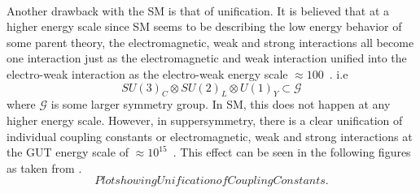 \paragraph*{}
Another drawback with the SM is that of unification. It is believed that at a higher energy scale since SM seems to be describing the low energy behavior of some parent theory, the electromagnetic, weak and strong interactions all become one interaction just as the electromagnetic and weak interaction unified into the electro-weak interaction as the electro-weak energy scale $\approx 100$~\GeV. i.e
\begin{equation}
SU(3)_{C} \otimes SU(2)_{L} \otimes U(1)_{Y} \subset \mathcal{G}
\end{equation}
where $\mathcal{G}$ is some larger symmetry group. In SM, this does not happen at any higher energy scale. However, in suppersymmetry, there is a clear unification of individual coupling constants or electromagnetic, weak and strong interactions at the GUT energy scale of $\approx 10^{15}$~\GeV.
This effect can be seen in the following figures as taken from \cite{}.
\begin{equation}
Plot showing Unification of Coupling Constants.
\end{equation}
